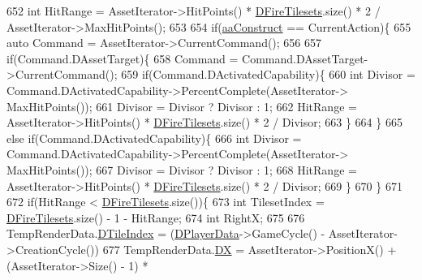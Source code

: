 \begin{DoxyCode}
652                 \textcolor{keywordtype}{int} HitRange = AssetIterator->HitPoints() * \hyperlink{classCAssetRenderer_a7598d4658acf64e85ddd6daeca88c8e6}{DFireTilesets}.size() * 2 / 
      AssetIterator->MaxHitPoints();
653                 
654                 \textcolor{keywordflow}{if}(\hyperlink{GameDataTypes_8h_ab47668e651a3032cfb9c40ea2d60d670a7ef6b863f66dd7dcc95a199cd758ae1d}{aaConstruct} == CurrentAction)\{
655                     \textcolor{keyword}{auto} Command = AssetIterator->CurrentCommand();
656 
657                     \textcolor{keywordflow}{if}(Command.DAssetTarget)\{
658                         Command = Command.DAssetTarget->CurrentCommand();
659                         \textcolor{keywordflow}{if}(Command.DActivatedCapability)\{
660                             \textcolor{keywordtype}{int} Divisor = Command.DActivatedCapability->PercentComplete(AssetIterator->
      MaxHitPoints());
661                             Divisor = Divisor ? Divisor : 1;
662                             HitRange = AssetIterator->HitPoints() * 
      \hyperlink{classCAssetRenderer_a7598d4658acf64e85ddd6daeca88c8e6}{DFireTilesets}.size() * 2 / Divisor;
663                         \}
664                     \}
665                     \textcolor{keywordflow}{else} \textcolor{keywordflow}{if}(Command.DActivatedCapability)\{
666                         \textcolor{keywordtype}{int} Divisor = Command.DActivatedCapability->PercentComplete(AssetIterator->
      MaxHitPoints());
667                         Divisor = Divisor ? Divisor : 1;
668                         HitRange = AssetIterator->HitPoints() * \hyperlink{classCAssetRenderer_a7598d4658acf64e85ddd6daeca88c8e6}{DFireTilesets}.size() * 2 / 
      Divisor;
669                     \}
670                 \}
671                 
672                 \textcolor{keywordflow}{if}(HitRange < \hyperlink{classCAssetRenderer_a7598d4658acf64e85ddd6daeca88c8e6}{DFireTilesets}.size())\{
673                     \textcolor{keywordtype}{int} TilesetIndex = \hyperlink{classCAssetRenderer_a7598d4658acf64e85ddd6daeca88c8e6}{DFireTilesets}.size() - 1 - HitRange;
674                     \textcolor{keywordtype}{int} RightX;
675                     
676                     TempRenderData.\hyperlink{structSAssetRenderData_a8c97c7f34d5b359f6fa23ce215a09929}{DTileIndex} = (\hyperlink{classCAssetRenderer_ae0f36013db2ef04b08b74d92249c1af5}{DPlayerData}->GameCycle() - 
      AssetIterator->CreationCycle()) %
677                     TempRenderData.\hyperlink{structSAssetRenderData_ab432edfd1146e38a92576b78e2ad5581}{DX} = AssetIterator->PositionX() + (AssetIterator->Size() - 1) * 

\end{DoxyCode}
